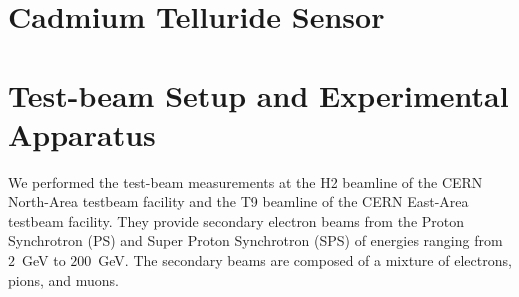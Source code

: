 \documentclass[preprint,1p]{elsarticle}
\begin{document}
 
 
\section{Cadmium Telluride Sensor}
\label{sec:siliconpad}


  
\section{Test-beam Setup and Experimental Apparatus }
\label{sec:tbeam}

We performed the test-beam measurements at the H2 beamline of the CERN North-Area testbeam facility
and the T9 beamline of the CERN East-Area testbeam facility. They provide secondary electron beams 
from the Proton Synchrotron (PS) and Super Proton Synchrotron (SPS)
of energies ranging from $2$~GeV to $200$~GeV. The secondary beams are composed of 
a mixture of electrons, pions, and muons. 
\end{document}
